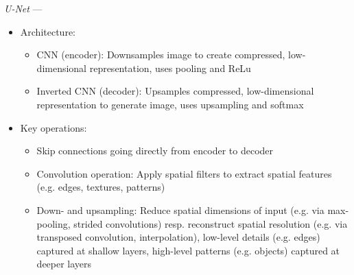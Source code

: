 \emph{U-Net} --- 
\begin{itemize}
    \item Architecture:
    \begin{itemize}
        \item CNN (encoder): Downsamples image to create compressed, low-dimensional representation, uses pooling and ReLu
        \item Inverted CNN (decoder): Upsamples compressed, low-dimensional representation to generate image, uses upsampling and softmax
    \end{itemize}
    \item Key operations:
    \begin{itemize}
        \item Skip connections going directly from encoder to decoder
        \item Convolution operation: Apply spatial filters to extract spatial features (e.g. edges, textures, patterns)
        \item Down- and upsampling: Reduce spatial dimensions of input (e.g. via max-pooling, strided convolutions) resp. reconstruct spatial resolution (e.g. via transposed convolution, interpolation), low-level details (e.g. edges) captured at shallow layers, high-level patterns (e.g. objects) captured at deeper layers
    \end{itemize}
\end{itemize}